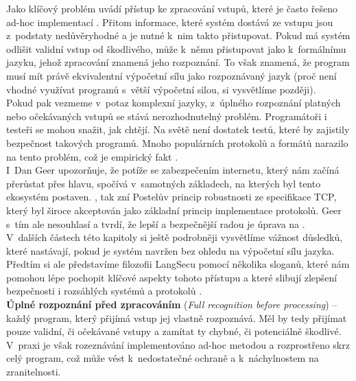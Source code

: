 Jako klíčový problém uvádí přístup ke zpracování vstupů, které je často řešeno ad-hoc implementací \cite{LangSecWeb}. Přitom informace, které systém
dostává ze vstupu jsou z~podstaty nedůvěryhodné a je nutné k~nim takto přistupovat. Pokud má systém odlišit validní vstup od škodlivého, může k~němu
přistupovat jako k~formálnímu jazyku, jehož zpracování znamená jeho rozpoznání. To však znamená, že program musí mít právě ekvivalentní výpočetní 
sílu jako rozpoznávaný jazyk (proč není vhodné využívat programů s~větší výpočetní silou, si vysvětlíme později). \\

Pokud pak vezmeme v~potaz komplexní jazyky, z~úplného rozpoznání platných nebo očekávaných vstupů se stává nerozhodnutelný problém. Programátoři 
i testeři se mohou snažit, jak chtějí. Na světě není dostatek testů, které by zajistily bezpečnost takových programů. Mnoho populárních protokolů 
a formátů narazilo na tento problém, což je empirický fakt \cite{LangSecWeb}. \\

I~Dan Geer \cite{Geer2010} upozorňuje, že potíže se zabezpečením internetu, který nám začíná přerůstat přes hlavu, spočívá v~samotných základech, 
na kterých byl tento ekosystém postaven. 
\textit{}, tak zní Postelův princip robustnosti ze specifikace TCP, 
který byl široce akceptován jako základní princip implementace protokolů.  Geer s~tím ale nesouhlasí a tvrdí, že lepší a bezpečnější radou je úprava 
na \textit{} \cite[str. 3]{Geer2010}. \\

V~dalších částech této kapitoly si ještě podrobněji vysvětlíme vážnost důsledků, které nastávají, pokud je systém navržen bez ohledu na výpočetní 
sílu jazyka. Předtím si ale představíme filozofii LangSecu pomocí několika sloganů, které nám pomohou lépe pochopit klíčové aspekty tohoto 
přístupu \cite{LangSecWeb} a které slibují zlepšení bezpečnosti i rozsáhlých systémů a protokolů \cite[str. 489]{Sass2013}. \\

\textbf{Úplné rozpoznání před zpracováním} (\textit{Full recognition before processing}) -- každý program, který přijímá vstup jej vlastně 
rozpoznává. Měl by tedy přijímat pouze validní, či očekávané vstupy a zamítat ty chybné, či potenciálně škodlivé. V~praxi je však rozeznávání 
implementováno ad-hoc metodou a rozprostřeno skrz celý program, což může vést k~nedostatečné ochraně a k~náchylnostem na zranitelnosti. \\

